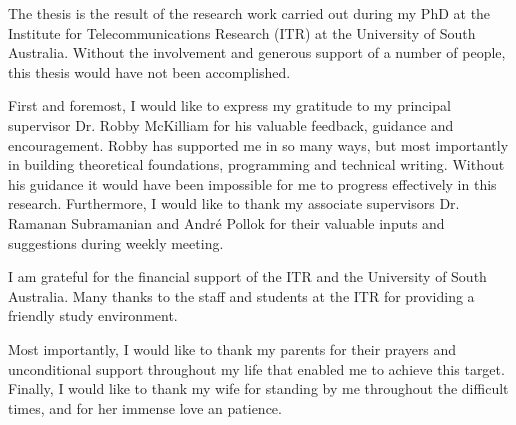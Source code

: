 The thesis is the result of the research work carried out during my PhD at the Institute for Telecommunications Research (ITR) at the University of South Australia. Without the involvement and generous support of a number of people, this thesis would have not been accomplished.

First and foremost, I would like to express my gratitude to my principal supervisor Dr. Robby McKilliam for his valuable feedback, guidance and encouragement. Robby has supported me in so many ways, but most importantly in building theoretical foundations, programming and technical writing. Without his guidance it would have been impossible for me to progress effectively in this research. Furthermore, I would like to thank my associate supervisors Dr. Ramanan Subramanian and Andr\'e Pollok for their valuable inputs and suggestions during weekly meeting.

I am grateful for the financial support of the ITR and the University of South Australia. Many thanks to the staff and students at the ITR for providing a friendly study environment.

Most importantly, I would like to thank my parents for their prayers and unconditional support throughout my life that enabled me to achieve this target. Finally, I would like to thank my wife for standing by me throughout the difficult times, and for her immense love an patience.